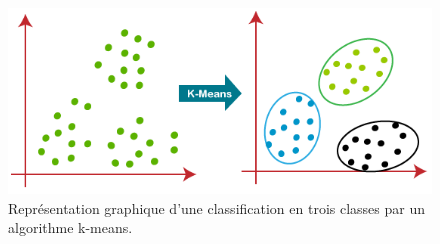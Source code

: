\begin{figure}
  \centering
  \includegraphics[width=12cm]{./Chapitre2/figures/clustering.png}
  \caption{Représentation graphique d'une classification en trois classes par un algorithme k-means.}
  \label{fig:clustering}
\end{figure}
